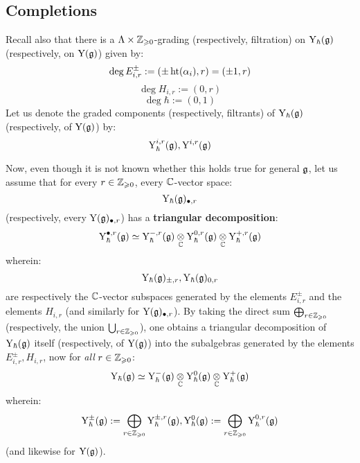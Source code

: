     \subsection{Completions}
        \begin{convention} \label{conv: canonical_grading_on_yangians}
            Recall also that there is a $\Lambda \x \Z_{\geq 0}$-grading (respectively, filtration) on $\mathrm{Y}_{\hbar}(\mathfrak{g})$ (respectively, on $\mathrm{Y}(\mathfrak{g})$) given by:
                $$\deg E_{i, r}^{\pm} := (\pm\operatorname{ht}(\alpha_i), r) = (\pm 1, r)$$
                $$\deg H_{i, r} := (0, r)$$
                $$\deg \hbar := (0, 1)$$
            Let us denote the graded components (respectively, filtrants) of $\mathrm{Y}_{\hbar}(\mathfrak{g})$ (respectively, of $\mathrm{Y}(\mathfrak{g})$) by:
                $$\mathrm{Y}_{\hbar}^{i, r}(\mathfrak{g}), \mathrm{Y}^{i, r}(\mathfrak{g})$$

            Now, even though it is not known whether this holds true for general $\mathfrak{g}$, let us assume that for every $r \in \mathbb{Z}_{\geqslant 0}$, every $\mathbb{C}$-vector space:
                $$\mathrm{Y}_{\hbar}(\mathfrak{g})_{\bullet, r}$$
            (respectively, every $\mathrm{Y}(\mathfrak{g})_{\bullet, r}$) has a \textbf{triangular decomposition}:
                $$\rmY_{\hbar}^{\bullet, r}(\g) \cong \rmY_{\hbar}^{-, r}(\g) \tensor_{\bbC} \rmY_{\hbar}^{0, r}(\g) \tensor_{\bbC} \rmY_{\hbar}^{+, r}(\g)$$
            wherein:
                $$\mathrm{Y}_{\hbar}(\mathfrak{g})_{\pm, r}, \mathrm{Y}_{\hbar}(\mathfrak{g})_{0, r}$$
            are respectively the $\mathbb{C}$-vector subspaces generated by the elements $E_{i, r}^{\pm}$ and the elements $H_{i, r}$ (and similarly for $\mathrm{Y}(\mathfrak{g})_{\bullet, r}$). By taking the direct sum $\bigoplus_{r \in \mathbb{Z}_{\geqslant 0}}$ (respectively, the union $\bigcup_{r \in \mathbb{Z}_{\geqslant 0}}$), one obtains a triangular decomposition of $\mathrm{Y}_{\hbar}(\mathfrak{g})$ itself (respectively, of $\mathrm{Y}(\mathfrak{g})$) into the subalgebras generated by the elements $E_{i, r}^{\pm}, H_{i, r}$, now for \textit{all} $r \in \mathbb{Z}_{\geqslant 0}$:
                $$\rmY_{\hbar}(\g) \cong \rmY_{\hbar}^-(\g) \tensor_{\bbC} \rmY_{\hbar}^0(\g) \tensor_{\bbC} \rmY_{\hbar}^+(\g)$$
            wherein:
                $$\mathrm{Y}_{\hbar}^{\pm}(\mathfrak{g}) := \bigoplus_{r \in \mathbb{Z}_{\geqslant 0}} \mathrm{Y}_{\hbar}^{\pm, r}(\mathfrak{g}), \mathrm{Y}_{\hbar}^0(\mathfrak{g}) := \bigoplus_{r \in \mathbb{Z}_{\geqslant 0}} \mathrm{Y}_{\hbar}^{0, r}(\mathfrak{g})$$
            (and likewise for $\mathrm{Y}(\mathfrak{g})$).
        \end{convention}